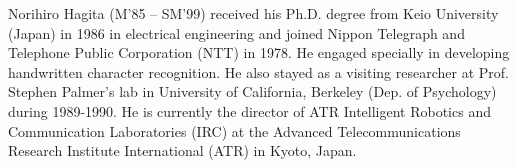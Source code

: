 \documentclass[journal]{IEEEtran}
\begin{document}
\begin{IEEEbiography}{Norihiro Hagita}
(M’85 – SM’99) received his Ph.D. degree from Keio University (Japan) in 1986 in electrical engineering and joined Nippon Telegraph and Telephone Public Corporation (NTT) in 1978. He engaged specially in developing handwritten character recognition.
He also stayed as a visiting researcher at Prof. Stephen Palmer's lab in University of California, Berkeley (Dep. of Psychology) during 1989-1990. He is currently the director of ATR Intelligent Robotics and Communication Laboratories (IRC) at the Advanced Telecommunications Research Institute International (ATR) in Kyoto, Japan.
\end{IEEEbiography}








\end{document}
